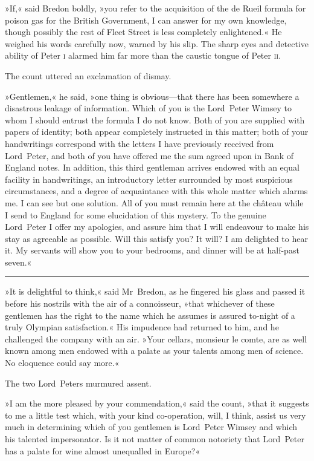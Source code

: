 »If,« said Bredon boldly, »you refer to the acquisition of the de Rueil formula for poison gas for the British Government, I can answer for my own knowledge, though possibly the rest of Fleet Street is less completely enlightened.« He weighed his words carefully now, warned by his slip. The sharp eyes and detective ability of Peter \textsc{i} alarmed him far more than the caustic tongue of Peter \textsc{ii}.

The count uttered an exclamation of dismay.

»Gentlemen,« he said, »one thing is obvious—that there has been somewhere a disastrous leakage of information. Which of you is the Lord~Peter Wimsey to whom I should entrust the formula I do not know. Both of you are supplied with papers of identity; both appear completely instructed in this matter; both of your handwritings correspond with the letters I have previously received from Lord~Peter, and both of you have offered me the sum agreed upon in Bank of England notes. In addition, this third gentleman arrives endowed with an equal facility in handwritings, an introductory letter surrounded by most suspicious circumstances, and a degree of acquaintance with this whole matter which alarms me. I can see but one solution. All of you must remain here at the château while I send to England for some elucidation of this mystery. To the genuine Lord~Peter I offer my apologies, and assure him that I will endeavour to make his stay as agreeable as possible. Will this satisfy you? It will? I am delighted to hear it. My servants will show you to your bedrooms, and dinner will be at half-past seven.«

\noindent\hfil\rule{0.5\textwidth}{.4pt}\hfil 

»It is delightful to think,« said Mr~Bredon, as he fingered his glass and passed it before his nostrils with the air of a connoisseur, »that whichever of these gentlemen has the right to the name which he assumes is assured to-night of a truly Olympian satisfaction.« His impudence had returned to him, and he challenged the company with an air. »Your cellars, monsieur le comte, are as well known among men endowed with a palate as your talents among men of science. No eloquence could say more.«

The two Lord~Peters murmured assent.

»I am the more pleased by your commendation,« said the count, »that it suggests to me a little test which, with your kind co-operation, will, I think, assist us very much in determining which of you gentlemen is Lord~Peter Wimsey and which his talented impersonator. Is it not matter of common notoriety that Lord~Peter has a palate for wine almost unequalled in Europe?«

